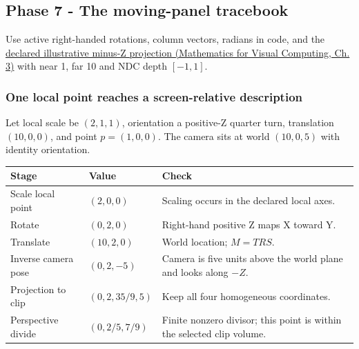 \subsection{Phase 7 - The moving-panel tracebook}\label{appendix-92ff77d4dfdc-phase-7---the-moving-panel-tracebook}

Use active right-handed rotations, column vectors, radians in code, and the \href{../02-Mathematics-for-Visual-Computing/main.pdf\#nameddest=01-foundations-i-ch019-figure-m6---follow-one-point-through-named-spaces}{declared illustrative minus-Z projection (Mathematics for Visual Computing, Ch. 3)} with near 1, far 10 and NDC depth \([-1,1]\).

\subsubsection{One local point reaches a screen-relative description}\label{appendix-92ff77d4dfdc-one-local-point-reaches-a-screen-relative-description}

Let local scale be \((2,1,1)\), orientation a positive-Z quarter turn, translation \((10,0,0)\), and point \(p=(1,0,0)\). The camera sits at world \((10,0,5)\) with identity orientation.

{\def\LTcaptype{none} %
\begin{longtable}[]{@{}
  >{\raggedright\arraybackslash}p{}
  >{\raggedright\arraybackslash}p{}
  >{\raggedright\arraybackslash}p{}@{}}
\toprule\noalign{}
\begin{minipage}[b]{\linewidth}\raggedright
Stage
\end{minipage} & \begin{minipage}[b]{\linewidth}\raggedright
Value
\end{minipage} & \begin{minipage}[b]{\linewidth}\raggedright
Check
\end{minipage} \\
\midrule\noalign{}
\endhead
\bottomrule\noalign{}
\endlastfoot
Scale local point & \((2,0,0)\) & Scaling occurs in the declared local axes. \\
Rotate & \((0,2,0)\) & Right-hand positive Z maps X toward Y. \\
Translate & \((10,2,0)\) & World location; \(M=TRS\). \\
Inverse camera pose & \((0,2,-5)\) & Camera is five units above the world plane and looks along \(-Z\). \\
Projection to clip & \((0,2,35/9,5)\) & Keep all four homogeneous coordinates. \\
Perspective divide & \((0,2/5,7/9)\) & Finite nonzero divisor; this point is within the selected clip volume. \\
\end{longtable}
}

